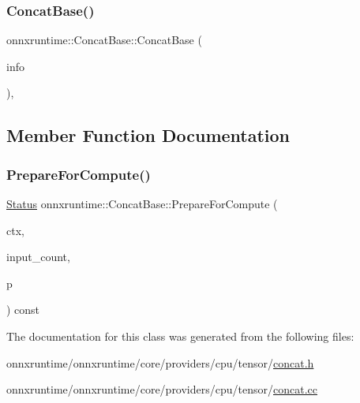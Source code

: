 \subsubsection{\texorpdfstring{Concat\+Base()}{ConcatBase()}}
{\footnotesize\ttfamily onnxruntime\+::\+Concat\+Base\+::\+Concat\+Base (\begin{DoxyParamCaption}\item[{const \mbox{\hyperlink{classonnxruntime_1_1OpKernelInfo}{Op\+Kernel\+Info}} \&}]{info }\end{DoxyParamCaption})\hspace{0.3cm}{\ttfamily [inline]}, {\ttfamily [protected]}}



\subsection{Member Function Documentation}
\mbox{\label{classonnxruntime_1_1ConcatBase_aacc8230a44ffcf63ce47eefa1b1b2bc5}} 
\subsubsection{\texorpdfstring{Prepare\+For\+Compute()}{PrepareForCompute()}}
{\footnotesize\ttfamily \mbox{\hyperlink{classonnxruntime_1_1common_1_1Status}{Status}} onnxruntime\+::\+Concat\+Base\+::\+Prepare\+For\+Compute (\begin{DoxyParamCaption}\item[{\mbox{\hyperlink{classonnxruntime_1_1OpKernelContext}{Op\+Kernel\+Context}} $\ast$}]{ctx,  }\item[{int}]{input\+\_\+count,  }\item[{\mbox{\hyperlink{structonnxruntime_1_1ConcatBase_1_1Prepare}{Prepare}} \&}]{p }\end{DoxyParamCaption}) const\hspace{0.3cm}{\ttfamily [protected]}}



The documentation for this class was generated from the following files\+:\begin{DoxyCompactItemize}
\item 
onnxruntime/onnxruntime/core/providers/cpu/tensor/\mbox{\hyperlink{cpu_2tensor_2concat_8h}{concat.\+h}}\item 
onnxruntime/onnxruntime/core/providers/cpu/tensor/\mbox{\hyperlink{cpu_2tensor_2concat_8cc}{concat.\+cc}}\end{DoxyCompactItemize}
